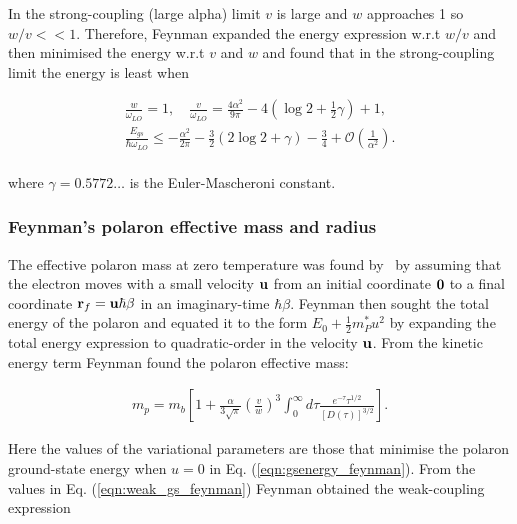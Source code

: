 In the strong-coupling (large alpha) limit $v$ is large and $w$ approaches 1 so $w / v << 1$. Therefore, Feynman expanded the energy expression w.r.t $w / v$ and then minimised the energy w.r.t $v$ and $w$ and found that in the strong-coupling limit the energy is least when 

\begin{equation}
\begin{gathered}
    \label{eqn:strong_gs_feynman}
    \frac{w}{\omega_{LO}} = 1, \quad \frac{v}{\omega_{LO}} = \frac{4\alpha^2}{9\pi} - 4\left( \log2 + \frac{1}{2} \gamma \right) + 1 , \\
    \frac{E_{gs}}{\hbar\omega_{LO}} \leq -\frac{\alpha^2}{2\pi} - \frac{3}{2}(2\log2+\gamma)-\frac{3}{4} + \mathcal{O}\left(\frac{1}{\alpha^2}\right) . \\
\end{gathered}
\end{equation}

where $\gamma = 0.5772 \dots$ is the Euler-Mascheroni constant. 

\subsubsection{Feynman's polaron effective mass and radius}
\label{subsec:2-2-2-2}

The effective polaron mass at zero temperature was found by~\cite{feynman_slow_1955} by assuming that the electron moves with a small velocity $\vb{u}$ from an initial coordinate $\vb{0}$ to a final coordinate $\vb{r}_f = \vb{u} \hbar\beta$ in an imaginary-time $\hbar\beta$. Feynman then sought the total energy of the polaron and equated it to the form $E_0 + \frac{1}{2}m^*_P u^2$ by expanding the total energy expression to quadratic-order in the velocity $\vb{u}$. From the kinetic energy term Feynman found the polaron effective mass:

\begin{equation}
\begin{gathered}
    \label{eqn:mass_feynman}
    m_p = m_b \left[ 1 + \frac{\alpha}{3\sqrt{\pi}} \left(\frac{v}{w}\right)^3 \int^\infty_0 d\tau \frac{e^{-\tau} \tau^{1/2}}{\left[D(\tau)\right]^{3/2}} \right].
\end{gathered}
\end{equation}

Here the values of the variational parameters are those that minimise the polaron ground-state energy when $u = 0$ in Eq. (\ref{eqn:gsenergy_feynman}). From the values in Eq. (\ref{eqn:weak_gs_feynman}) Feynman obtained the weak-coupling expression 

